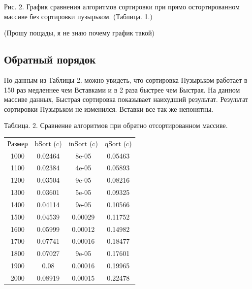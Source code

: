 \documentclass[12pt]{report}
\begin{document}
		\begin{center}
			\begin{center}
			\end{center}
			Рис. 2. График сравнения алгоритмов сортировки при прямо остортированном массиве без сортировки пузырьком. (Таблица. 1.)
		\end{center}
	
	(Прошу пощады, я не знаю почему график такой)

\subsection{Обратный порядок}

По данным из Таблицы 2. можно увидеть, что сортировка Пузырьком работает в 150 раз медленнее чем Вставками и в 2 раза быстрее чем Быстрая.
На данном массиве данных, Быстрая сортировка показывает наихудший результат.
Результат сортировки Пузырьком не изменился.
Вставки все так же непонятны.

\begin{center}
	Таблица. 2. Сравнение алгоритмов при обратно отсортированном массиве.
	\begin{tabular}{|c c c c|}
		\hline
		Размер & bSort (c) & inSort (c) & qSort (c) \\ [0.5ex]
		1000 & 0.02464 & 8e-05 & 0.05463 \\ 
		\hline 
		1100 & 0.02384 & 4e-05 & 0.05893 \\ 
		\hline 
		1200 & 0.03504 & 9e-05 & 0.08216 \\ 
		\hline 
		1300 & 0.03601 & 5e-05 & 0.09325 \\ 
		\hline 
		1400 & 0.04114 & 9e-05 & 0.10566 \\ 
		\hline 
		1500 & 0.04539 & 0.00029 & 0.11752 \\ 
		\hline 
		1600 & 0.05999 & 0.00012 & 0.14982 \\ 
		\hline 
		1700 & 0.07741 & 0.00016 & 0.18477 \\ 
		\hline 
		1800 & 0.07027 & 9e-05 & 0.17601 \\ 
		\hline 
		1900 & 0.08 & 0.00016 & 0.19965 \\ 
		\hline 
		2000 & 0.08919 & 0.00015 & 0.22478 \\ 
		\hline 
	\end{tabular}
\end{center}
\end{document}
